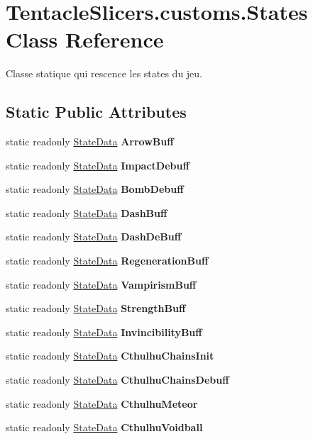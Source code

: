 \hypertarget{class_tentacle_slicers_1_1customs_1_1_states}{}\section{Tentacle\+Slicers.\+customs.\+States Class Reference}
\label{class_tentacle_slicers_1_1customs_1_1_states}


Classe statique qui rescence les states du jeu.  


\subsection*{Static Public Attributes}
\begin{DoxyCompactItemize}
\item 
static readonly \hyperlink{class_tentacle_slicers_1_1states_1_1_state_data}{State\+Data} {\bfseries Arrow\+Buff}
\item 
static readonly \hyperlink{class_tentacle_slicers_1_1states_1_1_state_data}{State\+Data} {\bfseries Impact\+Debuff}
\item 
static readonly \hyperlink{class_tentacle_slicers_1_1states_1_1_state_data}{State\+Data} {\bfseries Bomb\+Debuff}
\item 
static readonly \hyperlink{class_tentacle_slicers_1_1states_1_1_state_data}{State\+Data} {\bfseries Dash\+Buff}
\item 
static readonly \hyperlink{class_tentacle_slicers_1_1states_1_1_state_data}{State\+Data} {\bfseries Dash\+De\+Buff}
\item 
static readonly \hyperlink{class_tentacle_slicers_1_1states_1_1_state_data}{State\+Data} {\bfseries Regeneration\+Buff}
\item 
static readonly \hyperlink{class_tentacle_slicers_1_1states_1_1_state_data}{State\+Data} {\bfseries Vampirism\+Buff}
\item 
static readonly \hyperlink{class_tentacle_slicers_1_1states_1_1_state_data}{State\+Data} {\bfseries Strength\+Buff}
\item 
static readonly \hyperlink{class_tentacle_slicers_1_1states_1_1_state_data}{State\+Data} {\bfseries Invincibility\+Buff}
\item 
static readonly \hyperlink{class_tentacle_slicers_1_1states_1_1_state_data}{State\+Data} {\bfseries Cthulhu\+Chains\+Init}
\item 
static readonly \hyperlink{class_tentacle_slicers_1_1states_1_1_state_data}{State\+Data} {\bfseries Cthulhu\+Chains\+Debuff}
\item 
static readonly \hyperlink{class_tentacle_slicers_1_1states_1_1_state_data}{State\+Data} {\bfseries Cthulhu\+Meteor}
\item 
static readonly \hyperlink{class_tentacle_slicers_1_1states_1_1_state_data}{State\+Data} {\bfseries Cthulhu\+Voidball}
\end{DoxyCompactItemize}


